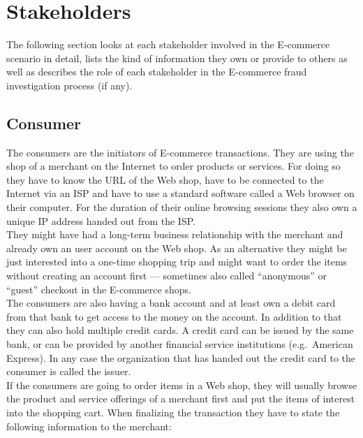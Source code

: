
\section{Stakeholders}
\label{sec:stakeholder_analysis}

The following section looks at each stakeholder involved in the \gls{E-commerce} scenario in detail, lists the kind of information they own or provide to others as well as describes the role of each stakeholder in the \gls{E-commerce} fraud investigation process (if any).

\subsection{Consumer}
\label{subsec:stakeholder_consumer}

The consumers are the initiators of \gls{E-commerce} transactions. They are using the shop of a merchant on the Internet to order products or services. For doing so they have to know the \gls{URL} of the Web shop, have to be connected to the Internet via an \gls{ISP} and have to use a standard software called a Web browser on their computer. For the duration of their online browsing sessions they also own a unique \gls{IP} address handed out from the \gls{ISP}.\\

They might have had a long-term business relationship with the merchant and already own an user account on the Web shop. As an alternative they might be just interested into a one-time shopping trip and might want to order the items without creating an account first --- sometimes also called ``anonymous'' or ``guest'' checkout in the \gls{E-commerce} shops. \\

The consumers are also having a bank account and at least own a debit card from that bank to get access to the money on the account. In addition to that they can also hold multiple credit cards. A credit card can be issued by the same bank, or can be provided by another financial service institutions (e.g.\ American Express). In any case the organization that has handed out the credit card to the consumer is called the issuer. \\

If the consumers are going to order items in a Web shop, they will usually browse the product and service offerings of a merchant first and put the items of interest into the shopping cart. When finalizing the transaction they have to state the following information to the merchant:\@

